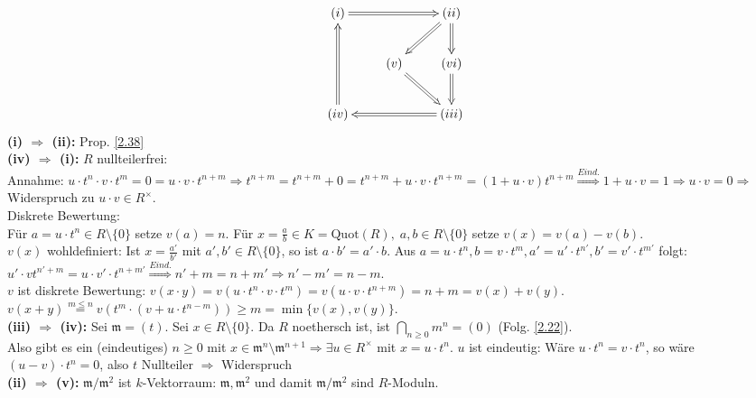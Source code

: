 \documentclass[a4paper, 10pt]{report}
\begin{document}
\begin{Bew} 
\[
  \begin{xy}
    \xymatrix{
       (i) \ar@{=>}[rr]  &                  &  (ii) \ar@{=>}[dl] \ar@{=>}[d] \\
                         & (v) \ar@{=>}[dr] & (vi) \ar@{=>}[d] \\
       (iv) \ar@{=>}[uu] &                  & (iii) \ar@{=>}[ll]
    }
  \end{xy}
\]
\textbf{(i) $\Rightarrow$ (ii):} Prop. \ref{2.38}\\
\textbf{(iv) $\Rightarrow$ (i):} $R$ nullteilerfrei:\\
Annahme: $u \cdot t^n \cdot
v \cdot t^m = 0 = u \cdot v \cdot t^{n+m} \Rightarrow t^{n+m} = t^{n+m} + 0 =
t^{n+m} + u \cdot v \cdot t^{n+m} = (1+u \cdot v) t^{n+m}
\overset{Eind.}{\Rightarrow} 1 + u \cdot v = 1 \Rightarrow u \cdot v = 0
\Rightarrow$ Widerspruch zu $u \cdot v \in R^{\times}$.\\
Diskrete Bewertung:\\
Für $a = u \cdot t^n \in R \setminus \{0\}$ setze $v(a) = n$.
Für $x = \frac{a}{b} \in K = \mathrm{Quot}(R), \; a,b \in R \setminus \{0\}$ setze
$v(x) = v(a) - v(b)$.\\
$v(x)$ wohldefiniert: Ist $x = \frac{a'}{b'}$ mit $a', b' \in R \setminus
\{0\}$, so ist $a \cdot b' =  a' \cdot b$. Aus $a = u \cdot t^n, b = v \cdot
t^m, a' = u' \cdot t^{n'}, b' = v' \cdot t^{m'}$ folgt: $u' \cdot v t^{n'+m} = u
\cdot v' \cdot t^{n + m'} \overset{Eind.}{\Rightarrow} n' + m = n + m'
\Rightarrow n'-m' = n-m$.\\
$v$ ist diskrete Bewertung: $v(x \cdot y) = v (u \cdot t^n \cdot v \cdot
t^m) = v(u \cdot v \cdot t^{n+m}) = n+m = v(x) + v(y)$.
$v(x + y) \overset{m \leq n}{=} v(t^m \cdot (v + u \cdot t^{n-m})) \geq m =
\min\{v(x),v(y)\}$.\\
\textbf{(iii) $\Rightarrow$ (iv):} Sei $\mathfrak{m} = (t)$. Sei $x \in R
\setminus \{0\}$. Da $R$ noethersch ist, ist $\bigcap_{n \geq 0} m^n = (0)$
(Folg. \ref{2.22}).\\
Also gibt es ein (eindeutiges) $n \geq 0$ mit $x \in \mathfrak{m}^n \setminus
\mathfrak{m}^{n+1} \Rightarrow \exists u \in R^{\times}$ mit $x = u \cdot t^n$.
$u$ ist eindeutig: Wäre $u \cdot t^n = v \cdot t^n$, so wäre $(u-v) \cdot t^n =
0$, also $t$ Nullteiler $\Rightarrow$ Widerspruch\\
\textbf{(ii) $\Rightarrow$ (v):} $\mathfrak{m}/\mathfrak{m}^2$ ist
$k$-Vektorraum: $\mathfrak{m}, \mathfrak{m}^2$ und damit
$\mathfrak{m}/\mathfrak{m}^2$ sind $R$-Moduln.

\end{Bew}
\end{document}
